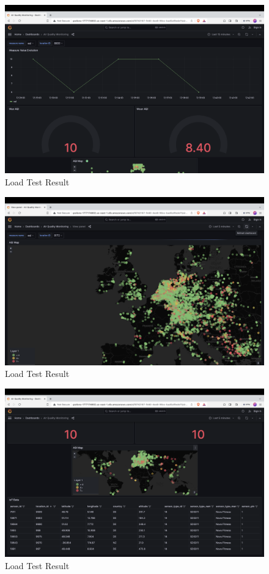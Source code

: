 \documentclass[12pt,oneside]{book} %
\begin{document}
\begin{figure}[H]
    \centering
    \includegraphics[width=1\linewidth]{images/grafana-1.png}
    \caption{Load Test Result}\label{fig:top-100-locations-most-affected}
\end{figure}


\begin{figure}[H]
    \centering
    \includegraphics[width=1\linewidth]{images/grafana-4.png}
    \caption{Load Test Result}\label{fig:top-100-locations-most-affected}
\end{figure}

\begin{figure}[H]
    \centering
    \includegraphics[width=1\linewidth]{images/grafana-2.png}
    \caption{Load Test Result}\label{fig:top-100-locations-most-affected}
\end{figure}
\end{document}
